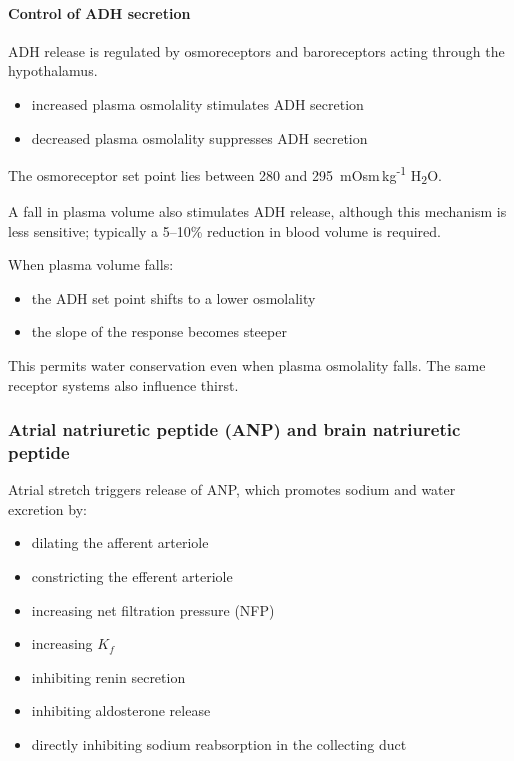\documentclass[11pt,a4paper]{article}
\begin{document}
\paragraph{Control of ADH secretion}

ADH release is regulated by osmoreceptors and baroreceptors acting through the hypothalamus.
\begin{itemize}
    \item increased plasma osmolality stimulates ADH secretion
    \item decreased plasma osmolality suppresses ADH secretion
\end{itemize}

The osmoreceptor set point lies between 280 and 295~mOsm\,kg\textsuperscript{-1} H\textsubscript{2}O.

A fall in plasma volume also stimulates ADH release, although this mechanism is less sensitive; typically a 5--10\% reduction in blood volume is required.

When plasma volume falls:
\begin{itemize}
    \item the ADH set point shifts to a lower osmolality
    \item the slope of the response becomes steeper
\end{itemize}

This permits water conservation even when plasma osmolality falls. The same receptor systems also influence thirst.

\subsubsection{Atrial natriuretic peptide (ANP) and brain natriuretic peptide}

Atrial stretch triggers release of ANP, which promotes sodium and water excretion by:
\begin{itemize}
    \item dilating the afferent arteriole
    \item constricting the efferent arteriole
    \item increasing net filtration pressure (NFP)
    \item increasing $K_f$
    \item inhibiting renin secretion
    \item inhibiting aldosterone release
    \item directly inhibiting sodium reabsorption in the collecting duct
\end{itemize}
\end{document}
